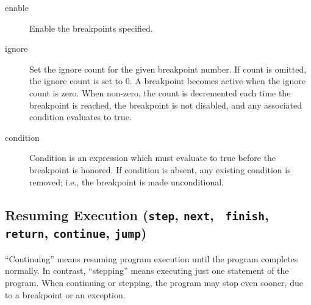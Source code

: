\begin{description}
\item[enable ]

Enable the breakpoints specified.

\item[ignore  ]

Set the ignore count for the given breakpoint number.  If count is
omitted, the ignore count is set to 0.  A breakpoint becomes active
when the ignore count is zero.  When non-zero, the count is
decremented each time the breakpoint is reached, the breakpoint is not
disabled, and any associated condition evaluates to true.

\item[condition  ]

Condition is an expression which must evaluate to true before
the breakpoint is honored.  If condition is absent, any existing
condition is removed; i.e., the breakpoint is made unconditional.

\end{description}

\subsection{Resuming Execution ({\tt step}, {\tt next}, {\tt
    finish}, {\tt return}, {\tt continue}, {\tt jump})\label{subsubsection-resume}}

``Continuing'' means resuming program execution until the program
completes normally.  In contrast, ``stepping'' means executing just
one statement of the program. When continuing or stepping, the program may stop even sooner, due to a breakpoint or an
exception.

